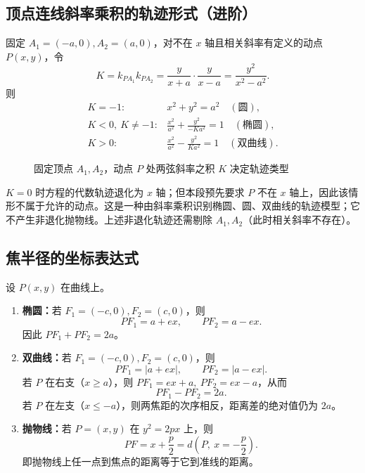 \documentclass[UTF8,zihao=-4,a4paper]{ctexart}
\newcommand{\abs}[1]{\left|#1\right|}
\begin{document}
\subsection{顶点连线斜率乘积的轨迹形式（进阶）}
固定 $A_1=(-a,0),A_2=(a,0)$，对不在 $x$ 轴且相关斜率有定义的动点 $P(x,y)$，令
\[
K=k_{PA_1}k_{PA_2}=\frac{y}{x+a}\cdot\frac{y}{x-a}=\frac{y^2}{x^2-a^2}.
\]
则
\[
\boxed{\begin{array}{ll}
K=-1:&x^2+y^2=a^2\quad(\text{圆}),\\[0.25em]
K<0,\ K\ne-1:&\displaystyle\frac{x^2}{a^2}+\frac{y^2}{-Ka^2}=1\quad(\text{椭圆}),\\[0.6em]
K>0:&\displaystyle\frac{x^2}{a^2}-\frac{y^2}{Ka^2}=1\quad(\text{双曲线}).
\end{array}}
\]
\begin{figure}[H]
\centering
{}
\caption{固定顶点 $A_1,A_2$，动点 $P$ 处两弦斜率之积 $K$ 决定轨迹类型}
\end{figure}

$K=0$ 时方程的代数轨迹退化为 $x$ 轴；但本段预先要求 $P$ 不在 $x$ 轴上，因此该情形不属于允许的动点。这是一种由斜率乘积识别椭圆、圆、双曲线的轨迹模型；它不产生非退化抛物线。上述非退化轨迹还需剔除 $A_1,A_2$（此时相关斜率不存在）。

\subsection{焦半径的坐标表达式}

设 $P(x,y)$ 在曲线上。

\begin{enumerate}
\item \textbf{椭圆：}若 $F_1=(-c,0),F_2=(c,0)$，则
\[
\boxed{PF_1=a+ex,\qquad PF_2=a-ex.}
\]
因此 $PF_1+PF_2=2a$。

\item \textbf{双曲线：}若 $F_1=(-c,0),F_2=(c,0)$，则
\[
\boxed{PF_1=\abs{a+ex},\qquad PF_2=\abs{a-ex}.}
\]
若 $P$ 在右支（$x\ge a$），则 $PF_1=ex+a,\ PF_2=ex-a$，从而
\[
PF_1-PF_2=2a.
\]
若 $P$ 在左支（$x\le-a$），则两焦距的次序相反，距离差的绝对值仍为 $2a$。

\item \textbf{抛物线：}若 $P=(x,y)$ 在 $y^2=2px$ 上，则
\[
\boxed{PF=x+\frac p2=d(P,\ x=-\frac p2).}
\]
即抛物线上任一点到焦点的距离等于它到准线的距离。
\end{enumerate}
\end{document}
